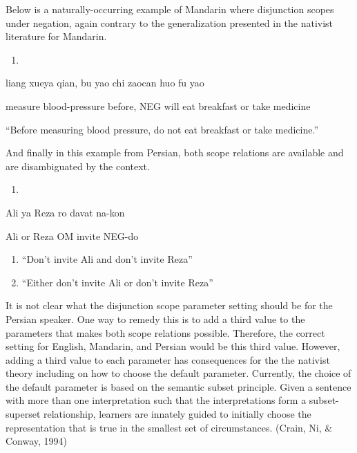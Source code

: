 \documentclass[oneside]{report}
\theoremstyle{definition}
\theoremstyle{definition}
\theoremstyle{definition}
\theoremstyle{remark}
\begin{document}
Below is a naturally-occurring example of Mandarin where disjunction
scopes under negation, again contrary to the generalization presented in
the nativist literature for Mandarin.
\begin{enumerate}
\def\labelenumi{(\arabic{enumi})}
\setcounter{enumi}{15}
\item
\end{enumerate}
liang xueya qian, bu yao chi zaocan huo fu yao

measure blood-pressure before, NEG will eat breakfast or take medicine

``Before measuring blood pressure, do not eat breakfast or take
medicine.''

And finally in this example from Persian, both scope relations are
available and are disambiguated by the context.
\begin{enumerate}
\def\labelenumi{(\arabic{enumi})}
\setcounter{enumi}{16}
\item
\end{enumerate}
Ali ya Reza ro davat na-kon

Ali or Reza OM invite NEG-do
\begin{enumerate}
\def\labelenumi{\arabic{enumi}.}
\item
  ``Don't invite Ali and don't invite Reza''
\item
  ``Either don't invite Ali or don't invite Reza''
\end{enumerate}
It is not clear what the disjunction scope parameter setting should be
for the Persian speaker. One way to remedy this is to add a third value
to the parameters that makes both scope relations possible. Therefore,
the correct setting for English, Mandarin, and Persian would be this
third value. However, adding a third value to each parameter has
consequences for the the nativist theory including on how to choose the
default parameter. Currently, the choice of the default parameter is
based on the semantic subset principle. Given a sentence with more than
one interpretation such that the interpretations form a subset-superset
relationship, learners are innately guided to initially choose the
representation that is true in the smallest set of circumstances.
(Crain, Ni, \& Conway, 1994)
\end{document}
